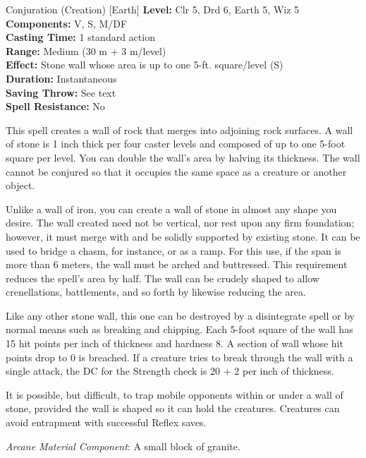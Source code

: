 {Conjuration (Creation) [Earth]}
{
	\textbf{Level:}
	Clr 5, Drd 6, Earth 5, Wiz 5\\
	\textbf{Components:}
	V, S, M/DF\\
	\textbf{Casting Time:}
	1 standard action\\
	\textbf{Range:}
	Medium (30 m + 3 m/level)\\
	\textbf{Effect:}
	Stone wall whose area is up to one 5-ft. square/level (S)\\
	\textbf{Duration:}
	Instantaneous\\
	\textbf{Saving Throw:}
	See text\\
	\textbf{Spell Resistance:}
	No\\
}
{
	This spell creates a wall of rock that merges into adjoining rock surfaces. A wall of stone is 1 inch thick per four caster levels and composed of up to one 5-foot square per level. You can double the wall's area by halving its thickness. The wall cannot be conjured so that it occupies the same space as a creature or another object.

	Unlike a wall of iron, you can create a wall of stone in almost any shape you desire. The wall created need not be vertical, nor rest upon any firm foundation; however, it must merge with and be solidly supported by existing stone. It can be used to bridge a chasm, for instance, or as a ramp. For this use, if the span is more than 6 meters, the wall must be arched and buttressed. This requirement reduces the spell's area by half. The wall can be crudely shaped to allow crenellations, battlements, and so forth by likewise reducing the area.

	Like any other stone wall, this one can be destroyed by a disintegrate spell or by normal means such as breaking and chipping. Each 5-foot square of the wall has 15 hit points per inch of thickness and hardness 8. A section of wall whose hit points drop to 0 is breached. If a creature tries to break through the wall with a single attack, the DC for the Strength check is 20 + 2 per inch of thickness.

	It is possible, but difficult, to trap mobile opponents within or under a wall of stone, provided the wall is shaped so it can hold the creatures. Creatures can avoid entrapment with successful Reflex saves.

	\textit{Arcane Material Component}:
	A small block of granite.

}
